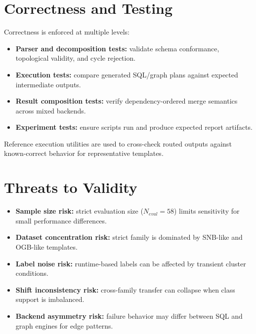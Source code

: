 \documentclass[conference]{IEEEtran}
\begin{document}
\section{Correctness and Testing}
Correctness is enforced at multiple levels:
\begin{itemize}[leftmargin=*]
\item \textbf{Parser and decomposition tests:} validate schema conformance, topological validity, and cycle rejection.
\item \textbf{Execution tests:} compare generated SQL/graph plans against expected intermediate outputs.
\item \textbf{Result composition tests:} verify dependency-ordered merge semantics across mixed backends.
\item \textbf{Experiment tests:} ensure scripts run and produce expected report artifacts.
\end{itemize}
Reference execution utilities are used to cross-check routed outputs against known-correct behavior for representative templates.

\section{Threats to Validity}
\begin{itemize}[leftmargin=*]
\item \textbf{Sample size risk:} strict evaluation size ($N_{eval}=58$) limits sensitivity for small performance differences.
\item \textbf{Dataset concentration risk:} strict family is dominated by SNB-like and OGB-like templates.
\item \textbf{Label noise risk:} runtime-based labels can be affected by transient cluster conditions.
\item \textbf{Shift inconsistency risk:} cross-family transfer can collapse when class support is imbalanced.
\item \textbf{Backend asymmetry risk:} failure behavior may differ between SQL and graph engines for edge patterns.
\end{itemize}
\end{document}
